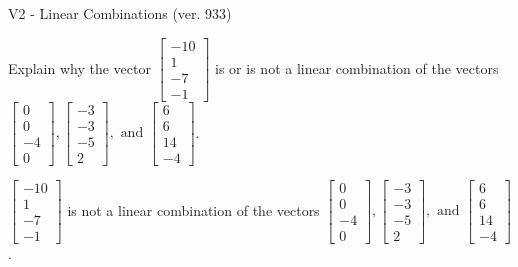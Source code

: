 \begin{exercise}
  \begin{exerciseTitle}V2 - Linear Combinations (ver. 933)\end{exerciseTitle}
  \begin{exerciseStatement}
    Explain why the vector \(\left[\begin{array}{c}
-10 \\
1 \\
-7 \\
-1
\end{array}\right]\)  is or is not a linear 
	combination of the vectors \(\left[\begin{array}{c}
0 \\
0 \\
-4 \\
0
\end{array}\right] , \left[\begin{array}{c}
-3 \\
-3 \\
-5 \\
2
\end{array}\right] , \text{ and } \left[\begin{array}{c}
6 \\
6 \\
14 \\
-4
\end{array}\right]\).
	


  \end{exerciseStatement}
  \begin{exerciseAnswer}
   \(\left[\begin{array}{c}
-10 \\
1 \\
-7 \\
-1
\end{array}\right]\) 
  	 is not  
	a linear combination of the vectors \(\left[\begin{array}{c}
0 \\
0 \\
-4 \\
0
\end{array}\right] , \left[\begin{array}{c}
-3 \\
-3 \\
-5 \\
2
\end{array}\right] , \text{ and } \left[\begin{array}{c}
6 \\
6 \\
14 \\
-4
\end{array}\right]\).

	
  


  \end{exerciseAnswer}
\end{exercise}